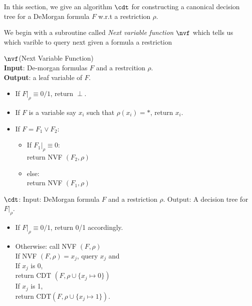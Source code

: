 In this section, we give an algorithm $\cdt$ for constructing a  canonical decision tree for a DeMorgan formula $F$ w.r.t a restriction $\rho$. %



We begin with a subroutine called \emph{Next variable function} $\nvf$ which tells us which varible to query next given a formula a restriction

\textbf{$\nvf$}(Next Variable Function)\\
{\bf Input}: De-morgan formulas $F$ and a restrcition $\rho$. \\
{\bf Output}: a leaf variable of $F$.
\begin{itemize}
    \item [1.] If $F|_\rho \equiv 0/1$, return $\perp$.
    \item [2.] If $F$ is a variable say $x_i$ such that  $\rho(x_i) = *$, return $x_i$.
    \item [3.] If $F = F_1 \vee F_2$:
        \begin{itemize}
            \item If $F_1|_{\rho} \equiv 0$:\\
                        return NVF $(F_2, \rho)$
            \item else: \\
                        return NVF $(F_1, \rho)$
        \end{itemize}                    
\end{itemize}

\textbf{$\cdt$}:
Input: DeMorgan formula $F$ and a restriction $\rho$.
Output: A decision tree for $F|_{\rho}$.
\begin{itemize}
    \item [1] If $F|_\rho \equiv 0/1$, return 0/1 accordingly.
    \item [2] Otherwise: 
        call NVF $(F,\rho)$\\ 
        If NVF $(F,\rho) = x_j$, 
            query $x_j$ and \\
            If $x_j$ is 0, \\
                return CDT $(F, \rho \cup \{x_j \mapsto 0\})$ \\
            If $x_j$ is 1, \\ 
                return CDT$(F, \rho \cup \{x_j \mapsto 1\})$.
\end{itemize}
 
 